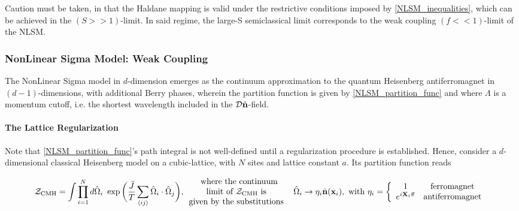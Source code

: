 Caution must be taken, in that the Haldane mapping is valid under the restrictive conditions imposed by \cref{NLSM_inequalities}, which can be achieved in the $(S>>1)$-limit. In said regime, the large-S semiclassical limit corresponds to the weak coupling $(f<<1)$-limit of the NLSM. \\

\subsubsection{NonLinear Sigma Model: Weak Coupling}

The NonLinear Sigma model in $d$-dimension emerges as the continuum approximation to the quantum Heisenberg antiferromagnet in $(d-1)$-dimensions, with additional Berry phases, wherein the partition function is given by \cref{NLSM_partition_func} and where $\Lambda$ is a momentum cutoff, i.e. the shortest wavelength included in the $\mathcal{D}\hat{{\bf n}}$-field. \\

\paragraph{The Lattice Regularization}

Note that \cref{NLSM_partition_func}'s path integral is not well-defined until a regularization procedure is established. Hence, consider a $d$-dimensional classical Heisenberg model on a cubic-lattice, with $N$ sites and lattice constant $a$. Its partition function reads 

\begin{equation}
    \mathcal{Z}_{\textnormal{CMH}} = \int \prod_{i=1}^{N} d\hat{\Omega}_i \textnormal{ } \exp \bigg(\frac{\bar{J}}{T} \sum_{\langle ij \rangle} \hat{\Omega}_i \cdot \hat{\Omega}_j\bigg), \begin{array}{c}
         \textnormal{ where the continuum} \\
         \textnormal{limit of $\mathcal{Z}_{\textnormal{CMH}}$ is } \\
         \textnormal{given by the substitutions } 
    \end{array}
    \textnormal{ } \hat{\Omega}_i  \rightarrow \eta_i \hat{{\bf n}}({\bf x}_i), \textnormal{ with } \eta_i = \left\{\begin{array}{cc}
              1 & \textnormal{ferromagnet } \\
              e^{i {\bf X}_i \vec{\pi}} & \textnormal{antiferromagnet }
         \end{array}  \right.
\end{equation}

